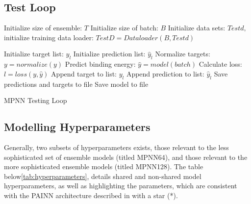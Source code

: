 \subsection{Test Loop}\label{subsec:test}

\begin{algorithm}[H]
    \begin{algorithmic}[2]
        \State Initialize size of ensemble: $T$
        \State Initialize size of batch: $B$
        \State Initialize data sets: $Testd, $
        \State initialize training data loader: $TestD = Dataloader(B,Testd)$

        \State Initialize target list: $y_{l}$
        \State Initialize prediction list: $\hat{y}_{l}$
        \State Normalize targets: $y = normalize(y)$
        \State Predict binding energy: $\hat{y} = model(batch)$
        \State Calculate loss: $l = loss(y,\hat{y})$
        \State Append target to list: $y_{l}$
        \State Append prediction to list: $\hat{y}_{l}$
        \EndFor
        \State Save predictions and targets to file
        \State Save model to file
        \EndFor
    \end{algorithmic}
    \caption{MPNN Testing Loop}
    \label{algo:MPNN_testing}
\end{algorithm}

\subsection{Modelling Hyperparameters}\label{subsec:mod-hyper}

Generally, two subsets of hyperparameters exists, those relevant to the less sophisticated set of ensemble models (titled MPNN64), and those
relevant to the more sophisticated ensemble models (titled MPNN128). The table below\ref{tab:hyperparameters},
details shared and non-shared model hyperparameters, as well
as highlighting the parameters, which are consistent with the PAINN architecture described in \cite{PAINN} with a star (*).

